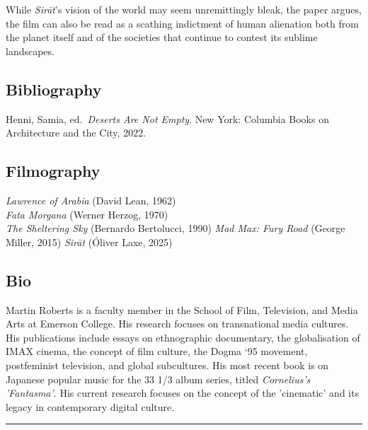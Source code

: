 \documentclass[
  letterpaper,
  DIV=11,
  numbers=noendperiod,
  oneside]{scrartcl}
\begin{document}
While \emph{Sirāt}'s vision of the world may seem unremittingly bleak,
the paper argues, the film can also be read as a scathing indictment of
human alienation both from the planet itself and of the societies that
continue to contest its sublime landscapes.

\subsection{Bibliography}\label{bibliography}

Henni, Samia, ed.~\emph{Deserts Are Not Empty}. New York: Columbia Books
on Architecture and the City, 2022.

\subsection{Filmography}\label{filmography}

\emph{Lawrence of Arabia} (David Lean, 1962)\\
\emph{Fata Morgana} (Werner Herzog, 1970)\\
\emph{The Sheltering Sky} (Bernardo Bertolucci, 1990) \emph{Mad Max:
Fury Road} (George Miller, 2015) \emph{Sirāt} (Óliver Laxe, 2025)

\subsection{Bio}\label{bio}

Martin Roberts is a faculty member in the School of Film, Television,
and Media Arts at Emerson College. His research focuses on transnational
media cultures. His publications include essays on ethnographic
documentary, the globalisation of IMAX cinema, the concept of film
culture, the Dogma `95 movement, postfeminist television, and global
subcultures. His most recent book is on Japanese popular music for the
33 1/3 album series, titled \emph{Cornelius's 'Fantasma'}. His current
research focuses on the concept of the 'cinematic' and its legacy in
contemporary digital culture.

\begin{center}\rule{0.5\linewidth}{0.5pt}\end{center}
\end{document}
